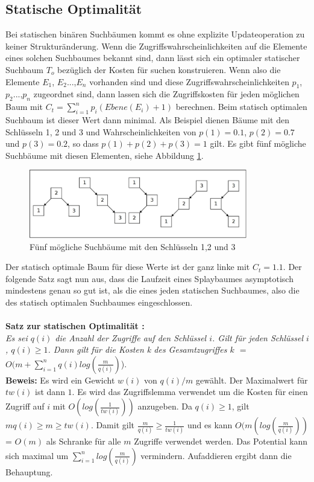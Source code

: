 \documentclass[11pt, a4paper]{article}
\begin{document}
 \subsection{Statische Optimalität}
Bei statischen binären Suchbäumen kommt es ohne explizite Updateoperation zu keiner Strukturänderung. 
Wenn die Zugriffswahrscheinlichkeiten auf die Elemente eines solchen  Suchbaumes bekannt sind, dann lässt sich ein optimaler statischer Suchbaum $T_o$ bezüglich der Kosten für suchen konstruieren. Wenn also  die Elemente $E_1$, $E_2$...,$E_n$ vorhanden sind und diese Zugriffswahrscheinlichkeiten $p_1$, $p_2$...,$p_n$ zugeordnet sind, dann lassen sich die Zugriffskosten für jeden möglichen Baum mit $C_t = \sum\limits_{i=1}^n p_i (Ebene(E_i) + 1)$ berechnen. Beim statisch optimalen Suchbaum ist dieser Wert dann minimal. Als Beispiel dienen Bäume mit den Schlüsseln 1, 2 und 3 und Wahrscheinlichkeiten von $p(1) = 0.1$, $p(2) = 0.7$ und $p(3) = 0.2$, so dass $p(1) + p(2) + p(3) = 1$ gilt. Es gibt fünf mögliche Suchbäume mit diesen Elementen, siehe Abbildung \ref{fig:5trees}.
\begin{figure}[h]
	\centering
	\includegraphics[width=0.85\textwidth]{"bilder/5trees"}
	\caption{Fünf mögliche Suchbäume mit den Schlüsseln 1,2 und 3 }
	\label{fig:5trees}
\end{figure}  
Der statisch optimale Baum für diese Werte ist der ganz linke mit $C_t = 1.1$.
Der folgende Satz sagt nun aus, dass die Laufzeit eines Splaybaumes asymptotisch mindestens genau so gut ist, als die eines jeden statischen Suchbaumes, also die des statisch optimalen Suchbaumes eingeschlossen. \\
\\
\noindent\textbf{Satz zur statischen Optimalität \cite{sl2}:}\\
\textit{Es sei $q(i)$ die Anzahl der Zugriffe auf den Schlüssel $i$. Gilt für jeden Schlüssel $i$, $q(i) \geq 1  $. Dann gilt für die Kosten k des Gesamtzugriffes $k$ $=$ $O(m + \sum\limits_{i = 1}^n  q(i)log(\frac{m}{q(i)})$}). \\

\noindent\textbf{Beweis:}
Es wird ein Gewicht $w(i)$ von $q(i)/m$ gewählt. Der Maximalwert für $tw(i)$ ist dann $1$. Es wird das Zugriffslemma verwendet um die Kosten für einen Zugriff auf $i$ mit $O(log(\frac{1}{tw(i)}))$ anzugeben.
Da $q(i) \geq 1$, gilt $mq(i) \geq m  \geq tw(i)$. Damit gilt $ \frac{m}{q(i)} \geq \frac{1}{tw(i)} $ und es kann  $O(m(log(\frac{m}{q(i)}))$ = $O(m)$ als Schranke für alle $m$ Zugriffe verwendet werden. Das Potential kann sich maximal um $\sum\limits_{i = 1}^n log(\frac{m}{q(i)})$  vermindern. Aufaddieren ergibt dann die Behauptung.  \\
\end{document}

